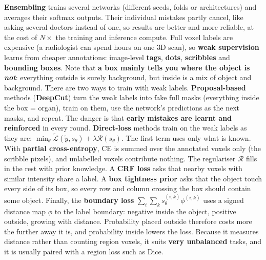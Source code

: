 \documentclass[a4paper]{article}
\newcommand{\K}[1]{\textcolor{kg}{\textbf{#1}}}
\newcommand{\F}[1]{\textcolor{fb}{#1}}
\newcommand{\E}[1]{\textcolor{ep}{#1}}
\newcommand{\T}[1]{\textcolor{tr}{\textbf{#1}}}
\begin{document}
\K{Ensembling} trains several networks (different seeds, folds or architectures) and averages their softmax outputs. Their individual mistakes partly cancel, like asking several doctors instead of one, so results are better and more reliable, at the cost of $N\times$ the training and inference compute. Full voxel labels are expensive (\E{a radiologist can spend hours on one 3D scan}), so \K{weak supervision} learns from cheaper annotations: image-level \K{tags}, \K{dots}, \K{scribbles} and \K{bounding boxes}. Note that \T{a box mainly tells you where the object is \emph{not}}: everything outside is surely background, but inside is a mix of object and background.
There are two ways to train with weak labels. \K{Proposal-based} methods (\K{DeepCut}) turn the weak labels into fake full masks (\E{everything inside the box = organ}), train on them, use the network's predictions as the next masks, and repeat. The danger is that \T{early mistakes are learnt and reinforced} in every round. \K{Direct-loss} methods train on the weak labels as they are: \F{$\min_\theta\widetilde{\mathcal L}(\tilde y,s_\theta)+\lambda\mathcal R(s_\theta)$}. The first term uses only what is known. With \K{partial cross-entropy}, CE is summed over the annotated voxels only (\E{the scribble pixels}), and unlabelled voxels contribute nothing. The regulariser $\mathcal R$ fills in the rest with prior knowledge. A \K{CRF loss} asks that nearby voxels with similar intensity share a label. A \K{box tightness prior} asks that the object touch every side of its box, so every row and column crossing the box should contain some object. Finally, the \K{boundary loss} \F{$\sum_i\sum_k s_\theta^{(i,k)}\phi^{(i,k)}$} uses a signed distance map $\phi$ to the label boundary: negative inside the object, positive outside, growing with distance. Probability placed outside therefore costs more the further away it is, and probability inside lowers the loss. Because it measures distance rather than counting region voxels, it suits \K{very unbalanced} tasks, and it is usually paired with a region loss such as Dice.
\end{document}

